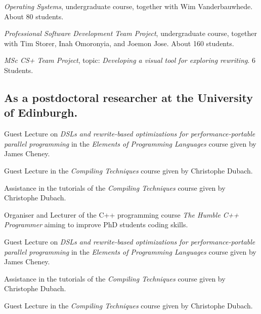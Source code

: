\begin{cvitemize}[2017 - 2018]
    \item \emph{Operating Systems}, undergraduate course, together with Wim Vanderbauwhede. About 80 students.
    \item \emph{Professional Software Development Team Project}, undergraduate course, together with  Tim Storer, Inah Omoronyia, and Joemon Jose. About 160 students.
    \item \emph{MSc CS+ Team Project}, topic: \emph{Developing a visual tool for exploring rewriting}. 6 Students.
\end{cvitemize}

\subsection{As a postdoctoral researcher at the University of Edinburgh.}

\begin{cvitemize}[2016 - 2017]
    \item Guest Lecture on \emph{\small DSLs and rewrite-based optimizations for performance-portable parallel programming} in the \emph{Elements of Programming Languages} course given by James Cheney.
    \item Guest Lecture in the \emph{Compiling Techniques} course given by Christophe Dubach.
    \item Assistance in the tutorials of the \emph{Compiling Techniques} course given by Christophe Dubach.
\end{cvitemize}

\begin{cvitemize}[2015 - 2016]
    \item Organiser and Lecturer of the C++ programming course \emph{The Humble C++ Programmer} aiming to improve PhD students coding skills.
    \item Guest Lecture on \emph{\small DSLs and rewrite-based optimizations for performance-portable parallel programming} in the \emph{Elements of Programming Languages} course given by James Cheney.
    \item Assistance in the tutorials of the \emph{Compiling Techniques} course given by Christophe Dubach.
\end{cvitemize}

\begin{cvitemize}[\small 2014 - 2015]
    \item Guest Lecture in the \emph{Compiling Techniques} course given by Christophe Dubach.
\end{cvitemize}

